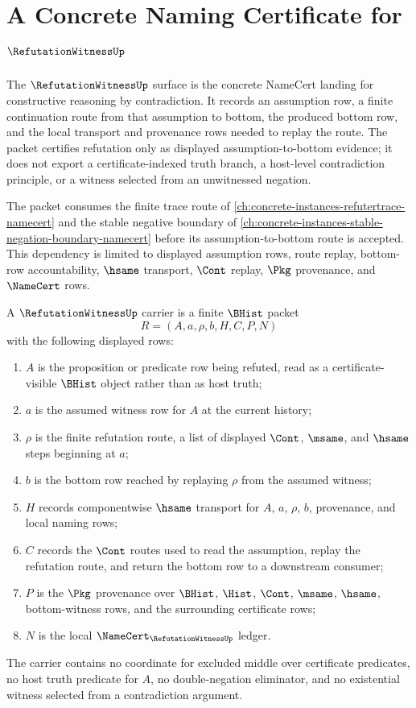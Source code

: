 \chapter{A Concrete Naming Certificate for $\RefutationWitnessUp$}
\label{ch:concrete-instances-refutationwitness-namecert}

The $\RefutationWitnessUp$ surface is the concrete NameCert landing for constructive reasoning by contradiction. It records an assumption row, a finite continuation route from that assumption to bottom, the produced bottom row, and the local transport and provenance rows needed to replay the route. The packet certifies refutation only as displayed assumption-to-bottom evidence; it does not export a certificate-indexed truth branch, a host-level contradiction principle, or a witness selected from an unwitnessed negation.

The packet consumes the finite trace route of \autoref{ch:concrete-instances-refutertrace-namecert} and the stable negative boundary of \autoref{ch:concrete-instances-stable-negation-boundary-namecert} before its assumption-to-bottom route is accepted. This dependency is limited to displayed assumption rows, route replay, bottom-row accountability, $\hsame$ transport, $\Cont$ replay, $\Pkg$ provenance, and $\NameCert$ rows.

\begin{definition}
\label{def:refutation-witness-carrier}
A $\RefutationWitnessUp$ carrier is a finite $\BHist$ packet
$$
R=(A,a,\rho,b,H,C,P,N)
$$
with the following displayed rows:
\begin{enumerate}
\item $A$ is the proposition or predicate row being refuted, read as a certificate-visible $\BHist$ object rather than as host truth;
\item $a$ is the assumed witness row for $A$ at the current history;
\item $\rho$ is the finite refutation route, a list of displayed $\Cont$, $\msame$, and $\hsame$ steps beginning at $a$;
\item $b$ is the bottom row reached by replaying $\rho$ from the assumed witness;
\item $H$ records componentwise $\hsame$ transport for $A$, $a$, $\rho$, $b$, provenance, and local naming rows;
\item $C$ records the $\Cont$ routes used to read the assumption, replay the refutation route, and return the bottom row to a downstream consumer;
\item $P$ is the $\Pkg$ provenance over $\BHist$, $\Hist$, $\Cont$, $\msame$, $\hsame$, bottom-witness rows, and the surrounding certificate rows;
\item $N$ is the local $\NameCert_{\RefutationWitnessUp}$ ledger.
\end{enumerate}
The carrier contains no coordinate for excluded middle over certificate predicates, no host truth predicate for $A$, no double-negation eliminator, and no existential witness selected from a contradiction argument.
\end{definition}

